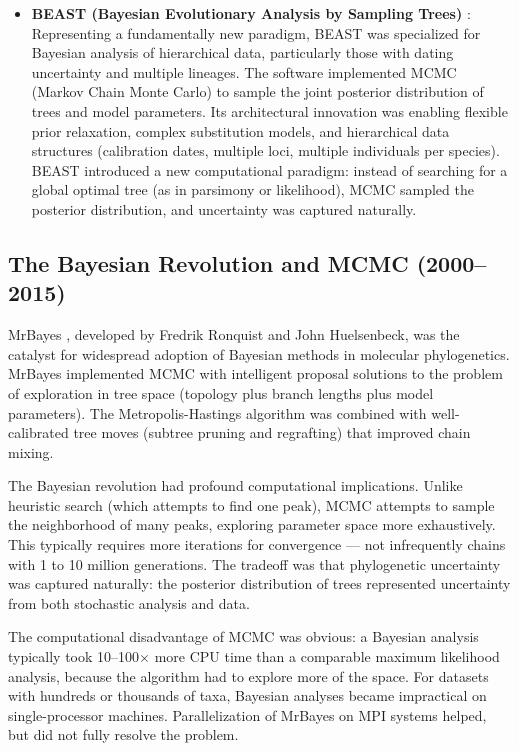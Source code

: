 \begin{itemize}
\item \textbf{BEAST (Bayesian Evolutionary Analysis by Sampling Trees)} \parencite{drummond2007}: Representing a fundamentally new paradigm, BEAST was specialized for Bayesian analysis of hierarchical data, particularly those with dating uncertainty and multiple lineages. The software implemented MCMC (Markov Chain Monte Carlo) to sample the joint posterior distribution of trees and model parameters. Its architectural innovation was enabling flexible prior relaxation, complex substitution models, and hierarchical data structures (calibration dates, multiple loci, multiple individuals per species). BEAST introduced a new computational paradigm: instead of searching for a global optimal tree (as in parsimony or likelihood), MCMC sampled the posterior distribution, and uncertainty was captured naturally.

\end{itemize}

\subsection{The Bayesian Revolution and MCMC (2000--2015)}

MrBayes \parencite{ronquist2003}, developed by Fredrik Ronquist and John Huelsenbeck, was the catalyst for widespread adoption of Bayesian methods in molecular phylogenetics. MrBayes implemented MCMC with intelligent proposal solutions to the problem of exploration in tree space (topology plus branch lengths plus model parameters). The Metropolis-Hastings algorithm was combined with well-calibrated tree moves (subtree pruning and regrafting) that improved chain mixing.

The Bayesian revolution had profound computational implications. Unlike heuristic search (which attempts to find one peak), MCMC attempts to sample the neighborhood of many peaks, exploring parameter space more exhaustively. This typically requires more iterations for convergence --- not infrequently chains with 1 to 10 million generations. The tradeoff was that phylogenetic uncertainty was captured naturally: the posterior distribution of trees represented uncertainty from both stochastic analysis and data.

The computational disadvantage of MCMC was obvious: a Bayesian analysis typically took 10--100$\times$ more CPU time than a comparable maximum likelihood analysis, because the algorithm had to explore more of the space. For datasets with hundreds or thousands of taxa, Bayesian analyses became impractical on single-processor machines. Parallelization of MrBayes on MPI systems helped, but did not fully resolve the problem.

